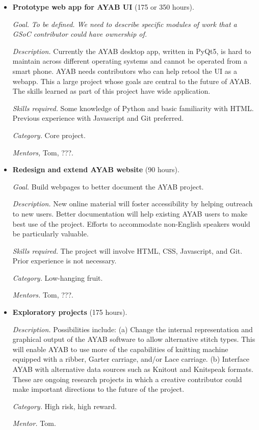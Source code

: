 \documentclass{article}
\begin{document}
\begin{itemize}
\item \textbf{Prototype web app for AYAB UI} (175 or 350 hours). 

\textit{Goal.} {\itshape To be defined. We need to describe specific modules of work that a GSoC contributor could have ownership of.}

\textit{Description.} Currently the AYAB desktop app, written in PyQt5, is hard to maintain across different operating systems and cannot be operated from a smart phone. AYAB needs contributors who can help retool the UI as a webapp. This a large project whose goals are central to the future of AYAB. The skills learned as part of this project have wide application.

\textit{Skills required.} Some knowledge of Python and basic familiarity with HTML. Previous experience with Javascript and Git preferred.

\textit{Category.} Core project. 

\textit{Mentors,} Tom, ???.


\item \textbf{Redesign and extend AYAB website} (90 hours). 

\textit{Goal.} Build webpages to better document the AYAB project. 

\textit{Description.} New online material will foster accessibility by helping outreach to new users. Better documentation will help existing AYAB users to make best use of the project. Efforts to accommodate non-English speakers would be particularly valuable.

\textit{Skills required.} The project will involve HTML, CSS, Javascript, and Git. Prior experience is not necessary.

\textit{Category.} Low-hanging fruit. 

\textit{Mentors.} Tom, ???.


\item \textbf{Exploratory projects} (175 hours). 

\textit{Description.} Possibilities include: (a) Change the internal representation and graphical output of the AYAB software to allow alternative stitch types. This will enable AYAB to use more of the capabilities of knitting machine equipped with a ribber, Garter carriage, and/or Lace carriage. (b) Interface AYAB with alternative data sources such as Knitout and Knitspeak formats. These are ongoing research projects in which a creative contributor could make important directions to the future of the project.

\textit{Category.} High risk, high reward.

\textit{Mentor.} Tom.
\end{itemize}
\end{document}

